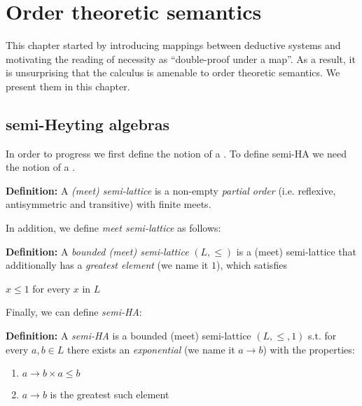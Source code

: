 \chapter{Order theoretic semantics}
\label{jcalcsem}
This chapter started by introducing 
mappings between deductive systems and 
motivating the reading of necessity as ``double-proof under a map''.
As a result, it is unsurprising that the calculus is amenable to order theoretic semantics.
We present them in this chapter.

\section{semi-Heyting algebras}
In order to progress we first define the notion of a 
. 
To define semi-HA we need the notion of a .
  

\begin{mdframed}
\textbf{Definition:}
A \textit{(meet) semi-lattice} is a non-empty \emph{partial order} (i.e. reflexive, antisymmetric and transitive) 
with finite meets.
\end{mdframed}
In addition, we define \emph{meet semi-lattice} as follows: 
\begin{mdframed}
\textbf{Definition:}
A \textit{bounded (meet) semi-lattice} $(L,\le)$ is a (meet) 
semi-lattice that additionally has 
a \emph{greatest element} (we name it $1$), which satisfies

$x \le 1$ for every $x$ in $L$
\end{mdframed}
Finally, we can define \emph{semi-HA}:

\begin{mdframed}
\textbf{Definition:}
A \textit{semi-HA} is a bounded (meet) semi-lattice $(L,\le, 1)$ 
s.t. for every $a,b\in L$ there exists an \textit{exponential} 
(we name it $a\rightarrow b$) 
with the properties: 
\begin{enumerate}
\item $a\rightarrow b\times a\le b $
\item $a\rightarrow b$ is the greatest such element
\end{enumerate}
\end{mdframed}

